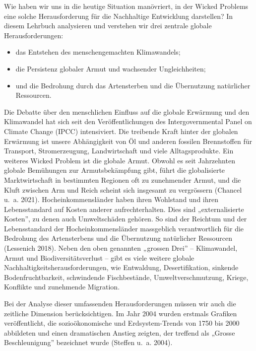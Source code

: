 \documentclass[
  nswissgerman,
  a4paper,
  openany]{book}
\begin{document}
Wie haben wir uns in die heutige Situation manövriert, in der Wicked
Problems eine solche Herausforderung für die Nachhaltige Entwicklung
darstellen? In diesem Lehrbuch analysieren und verstehen wir drei
zentrale globale Herausforderungen:

\begin{itemize}
\item
  das Entstehen des menschengemachten Klimawandels;
\item
  die Persistenz globaler Armut und wachsender Ungleichheiten;
\item
  und die Bedrohung durch das Artensterben und die Übernutzung
  natürlicher Ressourcen.
\end{itemize}

Die Debatte über den menschlichen Einfluss auf die globale Erwärmung und
den Klimawandel hat sich seit den Veröffentlichungen des
Intergovernmental Panel on Climate Change (IPCC) intensiviert. Die
treibende Kraft hinter der globalen Erwärmung ist unsere Abhängigkeit
von Öl und anderen fossilen Brennstoffen für Transport, Stromerzeugung,
Landwirtschaft und viele Alltagsprodukte. Ein weiteres Wicked Problem
ist die globale Armut. Obwohl es seit Jahrzehnten globale Bemühungen zur
Armutsbekämpfung gibt, führt die globalisierte Marktwirtschaft in
bestimmten Regionen oft zu zunehmender Armut, und die Kluft zwischen Arm
und Reich scheint sich insgesamt zu vergrössern (Chancel u.~a. 2021).
Hocheinkommensländer haben ihren Wohlstand und ihren Lebensstandard auf
Kosten anderer aufrechterhalten. Dies sind „externalisierte Kosten'', zu
denen auch Umweltschäden gehören. So sind der Reichtum und der
Lebensstandard der Hocheinkommensländer massgeblich verantwortlich für
die Bedrohung des Artensterbens und die Übernutzung natürlicher
Ressourcen (Lessenich 2018). Neben den oben genannten „grossen Drei'' --
Klimawandel, Armut und Biodiversitätsverlust -- gibt es viele weitere
globale Nachhaltigkeitsherausforderungen, wie Entwaldung,
Desertifikation, sinkende Bodenfruchtbarkeit, schwindende Fischbestände,
Umweltverschmutzung, Kriege, Konflikte und zunehmende Migration.

Bei der Analyse dieser umfassenden Herausforderungen müssen wir auch die
zeitliche Dimension berücksichtigen. Im Jahr 2004 wurden erstmals
Grafiken veröffentlicht, die sozioökonomische und Erdsystem-Trends von
1750 bis 2000 abbildeten und einen dramatischen Anstieg zeigten, der
treffend als „Grosse Beschleunigung'' bezeichnet wurde (Steffen u.~a.
2004).
\end{document}
